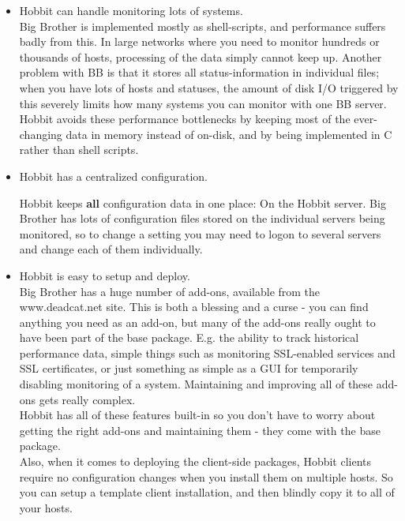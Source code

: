 \begin{itemize}
\item Hobbit can handle monitoring lots of systems.\\ 


 Big Brother is implemented mostly as shell-scripts, and performance
 suffers badly from this. In large networks where you need to monitor
 hundreds or thousands of hosts, processing of the data simply cannot
 keep up. Another problem with BB is that it stores all
 status-information in individual files; when you have lots of hosts
 and statuses, the amount of disk I/O triggered by this severely
 limits how many systems you can monitor with one BB server.\\ 

 Hobbit avoids these performance bottlenecks by keeping most of the
 ever-changing data in memory instead of on-disk, and by being
 implemented in C rather than shell scripts.


\item Hobbit has a centralized configuration. 

 Hobbit keeps \textbf{all}
 configuration data in one place: On the Hobbit server. Big Brother
 has lots of configuration files stored on the individual servers
 being monitored, so to change a setting you may need to logon to
 several servers and change each of them individually.


\item Hobbit is easy to setup and deploy.\\ 


 Big Brother has a huge number of add-ons, available from the
 www.deadcat.net site. This is both a blessing and a curse - you can
 find anything you need as an add-on, but many of the add-ons really
 ought to have been part of the base package. E.g. the ability to
 track historical performance data, simple things such as monitoring
 SSL-enabled services and SSL certificates, or just something as
 simple as a GUI for temporarily disabling monitoring of a
 system. Maintaining and improving all of these add-ons gets really
 complex.\\ 

 Hobbit has all of these features built-in so you don't have to worry
 about getting the right add-ons and maintaining them - they come with
 the base package.\\ 

 Also, when it comes to deploying the client-side packages, Hobbit
 clients require no configuration changes when you install them on
 multiple hosts. So you can setup a template client installation, and
 then blindly copy it to all of your hosts.



\end{itemize}
